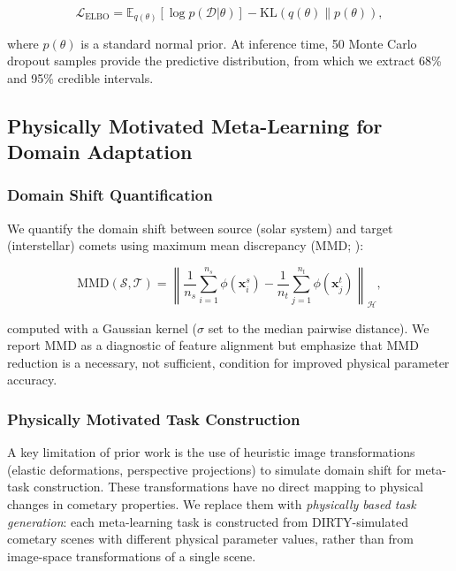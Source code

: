 \documentclass[preprint2]{aastex631}
\begin{document}
\begin{equation}\label{eq:elbo}
\mathcal{L}_{\text{ELBO}} = \mathbb{E}_{q(\theta)}[\log p(\mathcal{D}|\theta)] - \text{KL}(q(\theta) \| p(\theta)),
\end{equation}

where $p(\theta)$ is a standard normal prior. At inference time, 50 Monte Carlo dropout samples \citep{gal16} provide the predictive distribution, from which we extract 68\% and 95\% credible intervals.

\subsection{Physically Motivated Meta-Learning for Domain Adaptation}\label{sec:domain_adapt}

\subsubsection{Domain Shift Quantification}

We quantify the domain shift between source (solar system) and target (interstellar) comets using maximum mean discrepancy (MMD; \citealt{gretton12}):

\begin{equation}\label{eq:mmd}
\text{MMD}(\mathcal{S}, \mathcal{T}) = \left\| \frac{1}{n_s}\sum_{i=1}^{n_s} \phi(\mathbf{x}_i^s) - \frac{1}{n_t}\sum_{j=1}^{n_t} \phi(\mathbf{x}_j^t) \right\|_{\mathcal{H}},
\end{equation}

computed with a Gaussian kernel ($\sigma$ set to the median pairwise distance). We report MMD as a diagnostic of feature alignment but emphasize that MMD reduction is a necessary, not sufficient, condition for improved physical parameter accuracy.

\subsubsection{Physically Motivated Task Construction}

A key limitation of prior work is the use of heuristic image transformations (elastic deformations, perspective projections) to simulate domain shift for meta-task construction. These transformations have no direct mapping to physical changes in cometary properties. We replace them with \textit{physically based task generation}: each meta-learning task is constructed from DIRTY-simulated cometary scenes with different physical parameter values, rather than from image-space transformations of a single scene.
\end{document}
